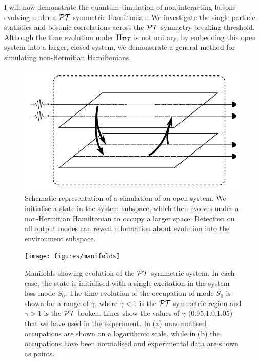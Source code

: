 I will now demonstrate the quantum simulation of non-interacting bosons
evolving under a \(\mathcal{PT}{}\) symmetric
Hamiltonian. We investigate the single-particle statistics and bosonic
correlations across the \(\mathcal{PT}{}\) symmetry breaking threshold. Although the time
evolution under \(\mathrm{H}_{\mathcal{PT}{}}\) is not unitary, by embedding this open
system into a larger, closed system, we demonstrate a general method for
simulating non-Hermitian Hamiltonians.

\begin{figure}[t]
  \centering
  \includegraphics{figures/opensystem}
  \caption[Representation of an open system]
  {Schematic representation of a simulation of an open system. We initialise a
  state in the system subspace, which then evolves under a non-Hermitian
  Hamiltonian to occupy a larger space. Detection on all output modes can reveal
  information about evolution into the environment subspace.}
  \label{fig:opensystem}
\end{figure}

\begin{figure}[t]
  \centering
  \texttt{[image: figures/manifolds]}
  \caption[Manifolds showing evolution of the PT-symmetric system]
  {Manifolds showing evolution of the \(\mathcal{PT}{}\)-symmetric system. In each case,
  the state is initialised with a single excitation in the system loss mode
  \(S_{0}\). The time evolution of the occupation of mode \(S_{0}\) is shown
  for a range of \(\gamma\), where \(\gamma < 1\) is the \(\mathcal{PT}\) symmetric
  region and \(\gamma > 1\) is the \(\mathcal{PT}\) broken. Lines show the values of
  \(\gamma\) (0.95,1.0,1.05) that we have used in the experiment. In (a)
  unnormalised occupations are shown on a logarithmic scale, while in (b) the
  occupations have been normalised and experimental data are shown as points.}
  \label{fig:manifolds}
\end{figure}

